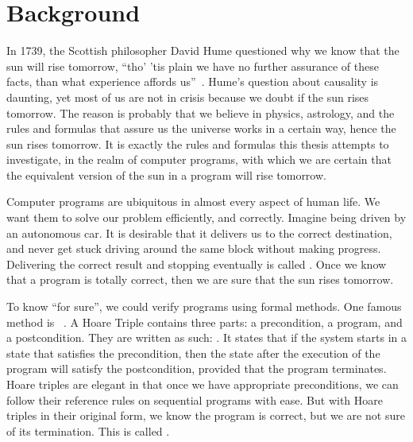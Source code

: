 \chapter{Background}\label{ch:background}


In 1739, the Scottish philosopher David Hume questioned why we know that the sun will rise tomorrow, ``tho' 'tis plain we have no further assurance of these facts, than what experience affords us''~\cite{hume1896}. 
Hume's question about causality is daunting, yet most of us are not in crisis because we doubt if the sun rises tomorrow. 
The reason is probably that we believe in physics, astrology, and the rules and formulas that assure us the universe works in a certain way, hence the sun rises tomorrow. 
It is exactly the rules and formulas this thesis attempts to investigate, in the realm of computer programs, with which we are certain that the equivalent version of the sun in a program will rise tomorrow. 

Computer programs are ubiquitous in almost every aspect of human life. 
We want them to solve our problem efficiently, and correctly. 
Imagine being driven by an autonomous car. It is desirable that it delivers us to the correct destination, and never get stuck driving around the same block without making progress. 
Delivering the correct result and stopping eventually is called . 
Once we know that a program is totally correct, then we are sure that the sun rises tomorrow. 

To know ``for sure'', we could verify programs using formal methods. 
One famous method is ~\cite{hoare69}. 
A Hoare Triple contains three parts: a precondition, a program, and a postcondition. 
They are written as such: .
It states that if the system starts in a state that satisfies the precondition, then the state after the execution of the program will satisfy the postcondition, provided that the program terminates.
Hoare triples are elegant in that once we have appropriate preconditions, we can follow their reference rules on sequential programs with ease. 
But with Hoare triples in their original form, we know the program is correct, but we are not sure of its termination. 
This is called . 


